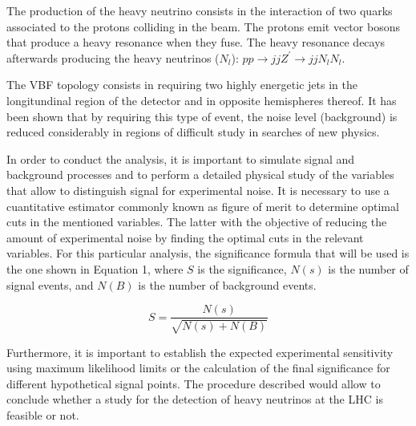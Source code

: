 The production of the heavy neutrino consists in the interaction of two quarks associated to the protons colliding in the beam. The protons emit vector bosons that produce a heavy resonance when they fuse. The heavy resonance decays afterwards producing the heavy neutrinos ($N_{l}$): $pp \rightarrow jj Z^{'} \rightarrow jj N_{l}N_{l}$.

The VBF topology consists in requiring two highly energetic jets in the longitundinal region of the detector and in opposite hemispheres thereof. It has been shown that by requiring this type of event, the noise level (background) is reduced considerably in regions of difficult study in searches of new physics.


In order to conduct the analysis, it is important to simulate signal and background processes and to perform a detailed physical study of the variables that allow to distinguish signal for experimental noise. It is necessary to use a cuantitative estimator commonly known as figure of merit to determine optimal cuts in the mentioned variables. The latter with the objective of reducing the amount of experimental noise by finding the optimal cuts in the relevant variables. For this particular analysis, the significance formula that will be used is the one shown in Equation 1, where $S$ is the significance, $N(s)$ is the number of signal events, and $N(B)$ is the number of background events.

\begin{equation}
    S = \frac{N(s)}{\sqrt{N(s) + N(B)}}
\end{equation}

Furthermore, it is important to establish the expected experimental sensitivity using maximum likelihood limits or the calculation of the final significance for different hypothetical signal points. The procedure described would allow to conclude whether a study for the detection of heavy neutrinos at the LHC is feasible or not.
